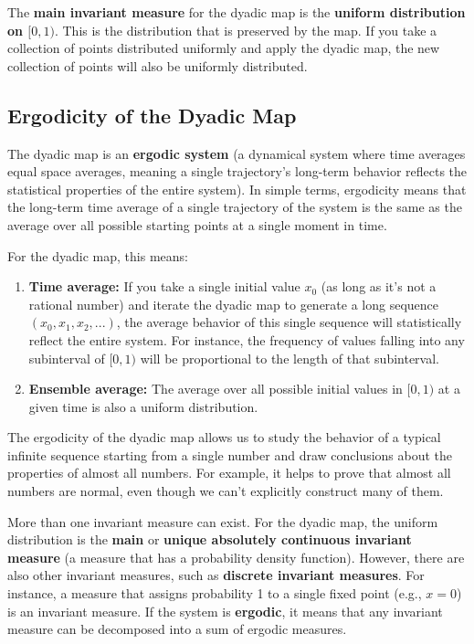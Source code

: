 \documentclass[12pt,a4paper]{article}
\begin{document}
The \textbf{main invariant measure} for the dyadic map is the \textbf{uniform distribution on $[0, 1)$}. This is the distribution that is preserved by the map. If you take a collection of points distributed uniformly and apply the dyadic map, the new collection of points will also be uniformly distributed.

\subsection{Ergodicity of the Dyadic Map}

The dyadic map is an \textbf{ergodic system} (a dynamical system where time averages equal space averages, meaning a single trajectory's long-term behavior reflects the statistical properties of the entire system). In simple terms, ergodicity means that the long-term time average of a single trajectory of the system is the same as the average over all possible starting points at a single moment in time.

For the dyadic map, this means:

\begin{enumerate}
    \item \textbf{Time average:} If you take a single initial value $x_0$ (as long as it's not a rational number) and iterate the dyadic map to generate a long sequence $(x_0, x_1, x_2, ...)$, the average behavior of this single sequence will statistically reflect the entire system. For instance, the frequency of values falling into any subinterval of $[0, 1)$ will be proportional to the length of that subinterval.
    \item \textbf{Ensemble average:} The average over all possible initial values in $[0, 1)$ at a given time is also a uniform distribution.
\end{enumerate}

The ergodicity of the dyadic map allows us to study the behavior of a typical infinite sequence starting from a single number and draw conclusions about the properties of almost all numbers. For example, it helps to prove that almost all numbers are normal, even though we can't explicitly construct many of them.

More than one invariant measure can exist. For the dyadic map, the uniform distribution is the \textbf{main} or \textbf{unique absolutely continuous invariant measure} (a measure that has a probability density function). However, there are also other invariant measures, such as \textbf{discrete invariant measures}. For instance, a measure that assigns probability 1 to a single fixed point (e.g., $x=0$) is an invariant measure. If the system is \textbf{ergodic}, it means that any invariant measure can be decomposed into a sum of ergodic measures.
\end{document}
